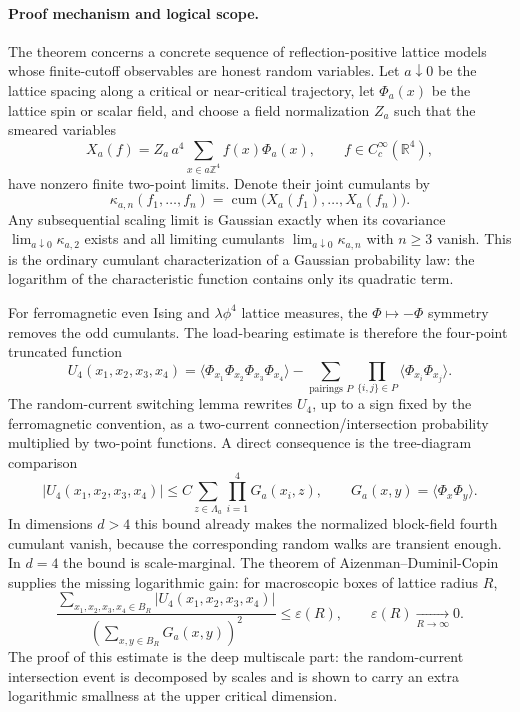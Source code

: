 \paragraph{Proof mechanism and logical scope.}
The theorem concerns a concrete sequence of reflection-positive lattice
models whose finite-cutoff observables are honest random variables.  Let
\(a\downarrow0\) be the lattice spacing along a critical or near-critical
trajectory, let \(\Phi_a(x)\) be the lattice spin or scalar field, and choose
a field normalization \(Z_a\) such that the smeared variables
\[
  X_a(f)
  =
  Z_a\,a^4\sum_{x\in a\mathbb Z^4}f(x)\Phi_a(x),
  \qquad f\in C_c^\infty(\mathbb R^4),
\]
have nonzero finite two-point limits.  Denote their joint cumulants by
\[
  \kappa_{a,n}(f_1,\ldots,f_n)
  =
  \operatorname{cum}\bigl(X_a(f_1),\ldots,X_a(f_n)\bigr).
\]
Any subsequential scaling limit is Gaussian exactly when its covariance
\(\lim_{a\downarrow0}\kappa_{a,2}\) exists and all limiting cumulants
\(\lim_{a\downarrow0}\kappa_{a,n}\) with \(n\ge3\) vanish.  This is the
ordinary cumulant characterization of a Gaussian probability law: the
logarithm of the characteristic function contains only its quadratic term.

For ferromagnetic even Ising and \(\lambda\phi^4\) lattice measures, the
\(\Phi\mapsto-\Phi\) symmetry removes the odd cumulants.  The load-bearing
estimate is therefore the four-point truncated function
\[
  U_4(x_1,x_2,x_3,x_4)
  =
  \langle\Phi_{x_1}\Phi_{x_2}\Phi_{x_3}\Phi_{x_4}\rangle
  -
  \sum_{\text{pairings }P}
  \prod_{\{i,j\}\in P}\langle\Phi_{x_i}\Phi_{x_j}\rangle .
\]
The random-current switching lemma rewrites \(U_4\), up to a sign fixed by
the ferromagnetic convention, as a two-current connection/intersection
probability multiplied by two-point functions.  A direct consequence is the
tree-diagram comparison
\[
  |U_4(x_1,x_2,x_3,x_4)|
  \le
  C\sum_{z\in\Lambda_a}
  \prod_{i=1}^4 G_a(x_i,z),
  \qquad
  G_a(x,y)=\langle\Phi_x\Phi_y\rangle .
\]
In dimensions \(d>4\) this bound already makes the normalized block-field
fourth cumulant vanish, because the corresponding random walks are
transient enough.  In \(d=4\) the bound is scale-marginal.  The theorem of
Aizenman--Duminil-Copin supplies the missing logarithmic gain: for
macroscopic boxes of lattice radius \(R\),
\begin{equation}
  \frac{
    \sum_{x_1,x_2,x_3,x_4\in B_R}
    |U_4(x_1,x_2,x_3,x_4)|
  }{
    \left(\sum_{x,y\in B_R}G_a(x,y)\right)^2
  }
  \le \varepsilon(R),
  \qquad
  \varepsilon(R)\xrightarrow[R\to\infty]{}0 .
  \label{eq:adc-four-point-cumulant-gain}
\end{equation}
The proof of this estimate is the deep multiscale part: the random-current
intersection event is decomposed by scales and is shown to carry an extra
logarithmic smallness at the upper critical dimension.

